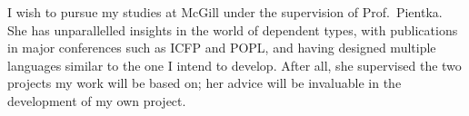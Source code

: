 \documentclass[11pt,letterpaper]{article}
\begin{document}
I wish to pursue my studies at McGill under the supervision of Prof.~Pientka.
She has unparallelled insights in the world of dependent types, with
publications in major conferences such as ICFP and POPL, and having designed
multiple languages similar to the one I intend to develop.
After all, she supervised the two projects my work will be based on; her advice
will be invaluable in the development of my own project.

% 
% 
% 
\end{document}
